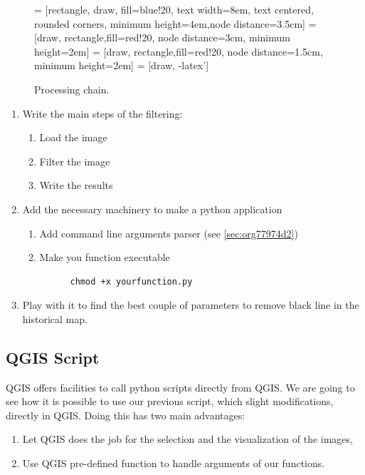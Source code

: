 \documentclass[a4paper,11pt,DIV=18]{scrartcl}
\begin{document}
\begin{figure}
 = [rectangle, draw, fill=blue!20, text width=8em, text centered, rounded corners, minimum height=4em,node distance=3.5cm]
   = [draw, rectangle,fill=red!20, node distance=3cm, minimum height=2em]
   = [draw, rectangle,fill=red!20, node distance=1.5cm, minimum height=2em]
   = [draw, -latex']
\caption{\label{org57d9afd}
Processing chain.}
\end{figure}

\begin{work}
\begin{enumerate}
\item Write the main steps of the filtering:
\begin{enumerate}
\item Load the image
\item Filter the image
\item Write the results
\end{enumerate}
\item Add the necessary machinery to make a python application
\begin{enumerate}
\item Add command line arguments parser (see \ref{sec:org77974d2})
\item Make you function executable

\begin{verbatim}
      chmod +x yourfunction.py
\end{verbatim}
\end{enumerate}
\item Play with it to find the best couple of parameters to remove black line in the historical map.
\end{enumerate}
\end{work}
\subsection{QGIS Script}
\label{sec:org210ed58}
QGIS offers facilities  to call python scripts directly  from QGIS. We
are going to see how it is  possible to use our previous script, which
slight  modifications,  directly in  QGIS.  Doing  this has  two  main
advantages:
\begin{enumerate}
\item Let QGIS does the job for the selection and the visualization of
the images,
\item Use QGIS pre-defined function to handle arguments of our functions.
\end{enumerate}
\end{document}
